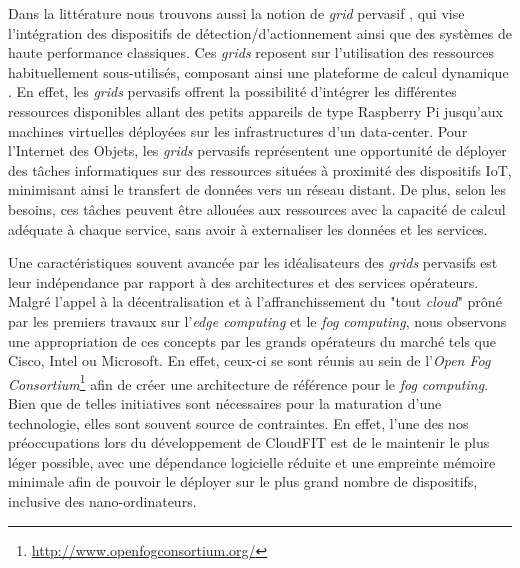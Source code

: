 Dans la littérature nous trouvons aussi la notion de \textit{grid} pervasif \cite{Parashar2010}, qui vise l'intégration des dispositifs de détection/d'actionnement ainsi que des systèmes de haute performance classiques. Ces \textit{grids} reposent sur l'utilisation des ressources habituellement sous-utilisés, composant ainsi une plateforme de calcul dynamique \cite{Steffenel2015Roma}. En effet, les \textit{grids} pervasifs offrent la possibilité d'intégrer les différentes ressources disponibles allant des petits appareils de type Raspberry Pi jusqu'aux machines virtuelles déployées sur les infrastructures d'un data-center. Pour l'Internet des Objets, les \textit{grids} pervasifs représentent une opportunité de déployer des tâches informatiques sur des ressources situées à proximité des dispositifs IoT, minimisant ainsi le transfert de données vers un réseau distant. De plus, selon les besoins, ces tâches peuvent être allouées aux ressources avec la capacité de calcul adéquate à chaque service, sans avoir à externaliser les données et les services.

Une caractéristiques souvent avancée par les idéalisateurs des \textit{grids} pervasifs est leur indépendance par rapport à des architectures et des services opérateurs. Malgré l'appel à la décentralisation et à l'affranchissement du "tout \textit{cloud}" prôné par les premiers travaux sur l'\textit{edge computing} et le \textit{fog computing}, nous observons une appropriation de ces concepts par les grands opérateurs du marché tels que Cisco, Intel ou Microsoft. En effet, ceux-ci se sont réunis au sein de l'\textit{Open Fog Consortium}\footnote{\url{http://www.openfogconsortium.org/}} afin de créer une architecture de référence pour le \textit{fog computing}. Bien que de telles initiatives sont nécessaires pour la maturation d'une technologie, elles sont souvent source de contraintes. En effet, l'une des nos préoccupations lors du développement de CloudFIT est de le maintenir le plus léger possible, avec une dépendance logicielle réduite et une empreinte mémoire minimale afin de pouvoir le déployer sur le plus grand nombre de dispositifs, inclusive des nano-ordinateurs.

